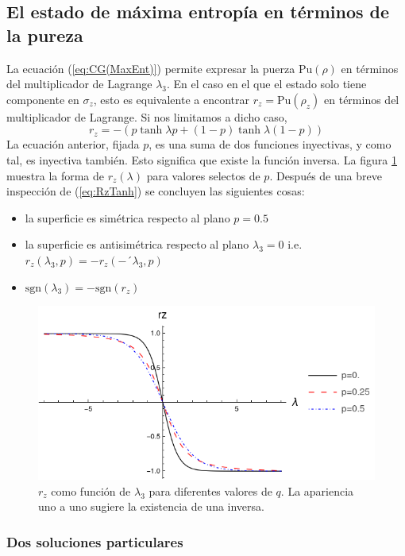 \subsection{El estado de máxima entropía en términos de la pureza}

La ecuación (\ref{eq:CG(MaxEnt)}) permite expresar la puerza $\text{Pu}(\rho)$ en términos del multiplicador de Lagrange $\lambda_{3}$. En el caso en el que el estado solo tiene componente en $\sigma_{z}$, esto es equivalente a encontrar $r_{z}=\text{Pu}(\rho_{z})$ en términos del multiplicador de Lagrange. Si nos limitamos a dicho caso,
\begin{equation}\label{eq:RzTanh}
    \boxed{r_{z}=-(p\tanh{\lambda p}+(1-p)\tanh{\lambda (1-p)})}  
\end{equation}
La ecuación anterior, fijada $p$, es una suma de dos funciones inyectivas, y como tal, es inyectiva también. Esto significa que existe la función inversa. La figura \ref{fig:rzinv} muestra la forma de $r_{z}(\lambda)$ para valores selectos de $p$. Después de una breve inspección de (\ref{eq:RzTanh}) se concluyen las siguientes cosas:
\begin{itemize}
\item la superficie es simétrica respecto al plano $p=0.5$
\item la superficie es antisimétrica  respecto al plano $\lambda_{3}=0$ i.e. $r_{z
}(\lambda_{3},p)=-r_{z
}(-´\lambda_{3},p)$
\item $\text{sgn}(\lambda_{3})=-\text{sgn}(r_{z})$
\end{itemize}
\begin{figure}[h!]
\centering
\includegraphics[width=0.6\linewidth]{maxent/figures/rz(lambda)_lambda-8to8.png}
\caption{$r_{z}$ como función de $\lambda_{3}$ para diferentes valores de $q$. La apariencia uno a uno sugiere la existencia de una inversa.}
\label{fig:rzinv}
\end{figure}

\subsubsection{Dos soluciones particulares}

